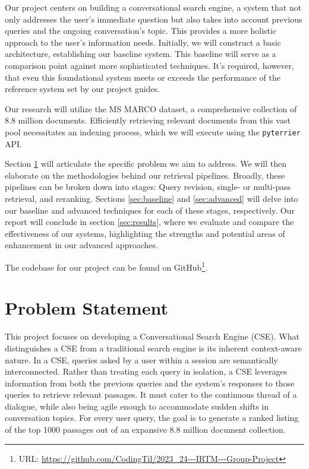 \documentclass[sigconf]{acmart}
\begin{document}
Our project centers on building a conversational search engine, a system that not only addresses the user's immediate question but also takes into account previous queries and the ongoing conversation's topic. This provides a more holistic approach to the user's information needs. Initially, we will construct a basic architecture, establishing our baseline system. This baseline will serve as a comparison point against more sophisticated techniques. It's required, however, that even this foundational system meets or exceeds the performance of the reference system set by our project guides.

Our research will utilize the MS MARCO dataset, a comprehensive collection of 8.8 million documents. Efficiently retrieving relevant documents from this vast pool necessitates an indexing process, which we will execute using the \texttt{pyterrier} API.

Section \ref{sec:problem} will articulate the specific problem we aim to address. We will then elaborate on the methodologies behind our retrieval pipelines. Broadly, these pipelines can be broken down into stages: Query revision, single- or multi-pass retrieval, and reranking. Sections \ref{sec:baseline} and \ref{sec:advanced} will delve into our baseline and advanced techniques for each of these stages, respectively. Our report will conclude in section \ref{sec:results}, where we evaluate and compare the effectiveness of our systems, highlighting the strengths and potential areas of enhancement in our advanced approaches.

The codebase for our project can be found on GitHub\footnote{URL: \url{https://github.com/CodingTil/2023_24---IRTM---Group-Project}}.

\section{Problem Statement}\label{sec:problem}
This project focuses on developing a Conversational Search Engine (CSE). What distinguishes a CSE from a traditional search engine is its inherent context-aware nature. In a CSE, queries asked by a user within a session are semantically interconnected. Rather than treating each query in isolation, a CSE leverages information from both the previous queries and the system's responses to those queries to retrieve relevant passages. It must cater to the continuous thread of a dialogue, while also being agile enough to accommodate sudden shifts in conversation topics. For every user query, the goal is to generate a ranked listing of the top 1000 passages out of an expansive 8.8 million document collection.
\end{document}
